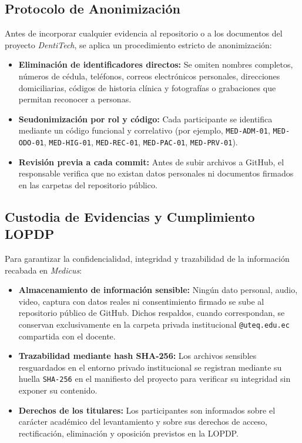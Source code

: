 \documentclass[12pt,a4paper]{article}
\begin{document}
\subsection{Protocolo de Anonimizaci{\'o}n}

Antes de incorporar cualquier evidencia al repositorio o a los documentos del proyecto \textit{DentiTech}, se aplica un procedimiento estricto de anonimizaci{\'o}n:
\begin{itemize}
    \item \textbf{Eliminaci{\'o}n de identificadores directos:} Se omiten nombres completos, n{\'u}meros de c{\'e}dula, tel{\'e}fonos, correos electr{\'o}nicos personales, direcciones domiciliarias, c{\'o}digos de historia cl{\'i}nica y fotograf{\'i}as o grabaciones que permitan reconocer a personas.
    \item \textbf{Seudonimizaci{\'o}n por rol y c{\'o}digo:} Cada participante se identifica mediante un c{\'o}digo funcional y correlativo (por ejemplo, \texttt{MED-ADM-01}, \texttt{MED-ODO-01}, \texttt{MED-HIG-01}, \texttt{MED-REC-01}, \texttt{MED-PAC-01}, \texttt{MED-PRV-01}).
    \item \textbf{Revisi{\'o}n previa a cada commit:} Antes de subir archivos a GitHub, el responsable verifica que no existan datos personales ni documentos firmados en las carpetas del repositorio p{\'u}blico.
\end{itemize}
\subsection{Custodia de Evidencias y Cumplimiento LOPDP}

Para garantizar la confidencialidad, integridad y trazabilidad de la informaci{\'o}n recabada en \textit{Medicus}:
\begin{itemize}
    \item \textbf{Almacenamiento de informaci{\'o}n sensible:} Ning{\'u}n dato personal, audio, video, captura con datos reales ni consentimiento firmado se sube al repositorio p{\'u}blico de GitHub. Dichos respaldos, cuando correspondan, se conservan exclusivamente en la carpeta privada institucional \texttt{@uteq.edu.ec} compartida con el docente.
    \item \textbf{Trazabilidad mediante hash SHA-256:} Los archivos sensibles resguardados en el entorno privado institucional se registran mediante su huella \texttt{SHA-256} en el manifiesto del proyecto para verificar su integridad sin exponer su contenido.
    \item \textbf{Derechos de los titulares:} Los participantes son informados sobre el car{\'a}cter acad{\'e}mico del levantamiento y sobre sus derechos de acceso, rectificaci{\'o}n, eliminaci{\'o}n y oposici{\'o}n previstos en la LOPDP.
\end{itemize}
\end{document}
